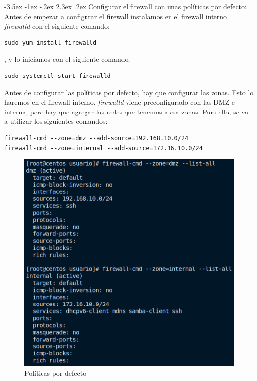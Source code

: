 \documentclass[11pt]{report}
\makeatletter
\renewcommand\chapter{\@startsection{chapter}{0}{\z@}%
    {-3.5ex \@plus -1ex \@minus -.2ex}%
    {2.3ex \@plus.2ex}%
    {\normalfont\Large\bfseries}}
\makeatother
\begin{document}
\cleardoublepage

\chapter{Configurar el firewall con unas políticas por defecto: }
Antes de empezar a configurar el firewall instalamos en el firewall interno \emph{firewalld} con el siguiente comando:
\begin{BVerbatim}
sudo yum install firewalld
\end{BVerbatim}
, y lo iniciamos con el siguiente comando: \\
\begin{BVerbatim}
sudo systemctl start firewalld
\end{BVerbatim}


Antes de configurar las políticas por defecto, hay que configurar las zonas. Esto lo haremos en el firewall interno.
\emph{firewalld} viene preconfigurado con las DMZ e interna, pero hay que agregar las redes que tenemos a esa zonas. 
Para ello, se va a utilizar los siguientes comandos:
\begin{verbatim}
firewall-cmd --zone=dmz --add-source=192.168.10.0/24
firewall-cmd --zone=internal --add-source=172.16.10.0/24
\end{verbatim}
\begin{figure}[H]
  \centering
  \includegraphics[scale=0.65]{img/resultado_politicas_por_defecto.png}
  \caption{Políticas por defecto}
  \label{fig:politicas por defecto}
\end{figure}
\end{document}
